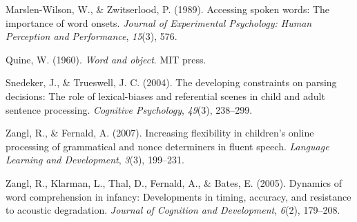 \documentclass[12pt,]{article}
\begin{document}
Marslen-Wilson, W., \& Zwitserlood, P. (1989). Accessing spoken words:
The importance of word onsets. \emph{Journal of Experimental Psychology:
Human Perception and Performance}, \emph{15}(3), 576.

Quine, W. (1960). \emph{Word and object}. MIT press.

Snedeker, J., \& Trueswell, J. C. (2004). The developing constraints on
parsing decisions: The role of lexical-biases and referential scenes in
child and adult sentence processing. \emph{Cognitive Psychology},
\emph{49}(3), 238--299.

Zangl, R., \& Fernald, A. (2007). Increasing flexibility in children's
online processing of grammatical and nonce determiners in fluent speech.
\emph{Language Learning and Development}, \emph{3}(3), 199--231.

Zangl, R., Klarman, L., Thal, D., Fernald, A., \& Bates, E. (2005).
Dynamics of word comprehension in infancy: Developments in timing,
accuracy, and resistance to acoustic degradation. \emph{Journal of
Cognition and Development}, \emph{6}(2), 179--208.
\end{document}

